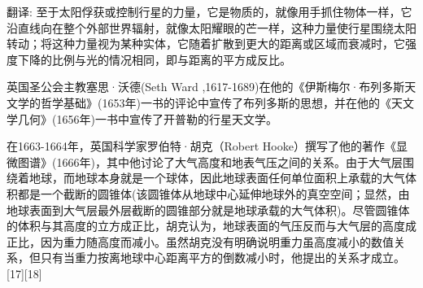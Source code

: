 翻译: 至于太阳俘获或控制行星的力量，它是物质的，就像用手抓住物体一样，它沿直线向在整个外部世界辐射，就像太阳耀眼的芒一样，这种力量使行星围绕太阳转动；将这种力量视为某种实体，它随着扩散到更大的距离或区域而衰减时，它强度下降的比例与光的情况相同，即与距离的平方成反比。

英国圣公会主教塞思·沃德(Seth Ward ,1617-1689)在他的《伊斯梅尔·布列多斯天文学的哲学基础》(1653年)一书的评论中宣传了布列多斯的思想，并在他的《天文学几何》(1656年)一书中宣传了开普勒的行星天文学。

在1663-1664年，英国科学家罗伯特·胡克（Robert Hooke）撰写了他的著作《显微图谱》(1666年)，其中他讨论了大气高度和地表气压之间的关系。由于大气层围绕着地球，而地球本身就是一个球体，因此地球表面任何单位面积上承载的大气体积都是一个截断的圆锥体(该圆锥体从地球中心延伸地球外的真空空间；显然，由地球表面到大气层最外层截断的圆锥部分就是地球承载的大气体积)。尽管圆锥体的体积与其高度的立方成正比，胡克认为，地球表面的气压反而与大气层的高度成正比，因为重力随高度而减小。虽然胡克没有明确说明重力虽高度减小的数值关系，但只有当重力按离地球中心距离平方的倒数减小时，他提出的关系才成立。[17][18]